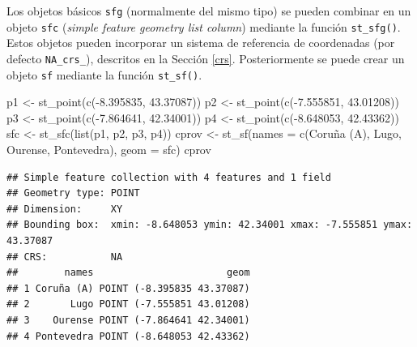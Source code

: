 \documentclass[
  spanish,
]{book}
\newenvironment{Shaded}{\begin{snugshade}}{\end{snugshade}}
\newcommand{\AttributeTok}[1]{\textcolor[rgb]{0.77,0.63,0.00}{#1}}
\newcommand{\FloatTok}[1]{\textcolor[rgb]{0.00,0.00,0.81}{#1}}
\newcommand{\FunctionTok}[1]{\textcolor[rgb]{0.00,0.00,0.00}{#1}}
\newcommand{\NormalTok}[1]{#1}
\newcommand{\OtherTok}[1]{\textcolor[rgb]{0.56,0.35,0.01}{#1}}
\newcommand{\SpecialCharTok}[1]{\textcolor[rgb]{0.00,0.00,0.00}{#1}}
\newcommand{\StringTok}[1]{\textcolor[rgb]{0.31,0.60,0.02}{#1}}
\theoremstyle{break}
\begin{document}
Los objetos básicos \texttt{sfg} (normalmente del mismo tipo) se pueden combinar en un objeto \texttt{sfc} (\emph{simple feature geometry list column}) mediante la función \texttt{st\_sfg()}.
Estos objetos pueden incorporar un sistema de referencia de coordenadas (por defecto \texttt{NA\_crs\_}), descritos en la Sección \ref{crs}.
Posteriormente se puede crear un objeto \texttt{sf} mediante la función \texttt{st\_sf()}.

\begin{Shaded}
\begin{Highlighting}[]
\NormalTok{p1 }\OtherTok{\textless{}{-}} \FunctionTok{st\_point}\NormalTok{(}\FunctionTok{c}\NormalTok{(}\SpecialCharTok{{-}}\FloatTok{8.395835}\NormalTok{, }\FloatTok{43.37087}\NormalTok{))}
\NormalTok{p2 }\OtherTok{\textless{}{-}} \FunctionTok{st\_point}\NormalTok{(}\FunctionTok{c}\NormalTok{(}\SpecialCharTok{{-}}\FloatTok{7.555851}\NormalTok{, }\FloatTok{43.01208}\NormalTok{))}
\NormalTok{p3 }\OtherTok{\textless{}{-}} \FunctionTok{st\_point}\NormalTok{(}\FunctionTok{c}\NormalTok{(}\SpecialCharTok{{-}}\FloatTok{7.864641}\NormalTok{, }\FloatTok{42.34001}\NormalTok{))}
\NormalTok{p4 }\OtherTok{\textless{}{-}} \FunctionTok{st\_point}\NormalTok{(}\FunctionTok{c}\NormalTok{(}\SpecialCharTok{{-}}\FloatTok{8.648053}\NormalTok{, }\FloatTok{42.43362}\NormalTok{))}
\NormalTok{sfc }\OtherTok{\textless{}{-}} \FunctionTok{st\_sfc}\NormalTok{(}\FunctionTok{list}\NormalTok{(p1, p2, p3, p4))}
\NormalTok{cprov }\OtherTok{\textless{}{-}} \FunctionTok{st\_sf}\NormalTok{(}\AttributeTok{names =} \FunctionTok{c}\NormalTok{(}\StringTok{\textquotesingle{}Coruña (A)\textquotesingle{}}\NormalTok{, }\StringTok{\textquotesingle{}Lugo\textquotesingle{}}\NormalTok{, }\StringTok{\textquotesingle{}Ourense\textquotesingle{}}\NormalTok{, }\StringTok{\textquotesingle{}Pontevedra\textquotesingle{}}\NormalTok{),}
    \AttributeTok{geom =}\NormalTok{ sfc)}
\NormalTok{cprov}
\end{Highlighting}
\end{Shaded}

\begin{verbatim}
## Simple feature collection with 4 features and 1 field
## Geometry type: POINT
## Dimension:     XY
## Bounding box:  xmin: -8.648053 ymin: 42.34001 xmax: -7.555851 ymax: 43.37087
## CRS:           NA
##        names                       geom
## 1 Coruña (A) POINT (-8.395835 43.37087)
## 2       Lugo POINT (-7.555851 43.01208)
## 3    Ourense POINT (-7.864641 42.34001)
## 4 Pontevedra POINT (-8.648053 42.43362)
\end{verbatim}
\end{document}
